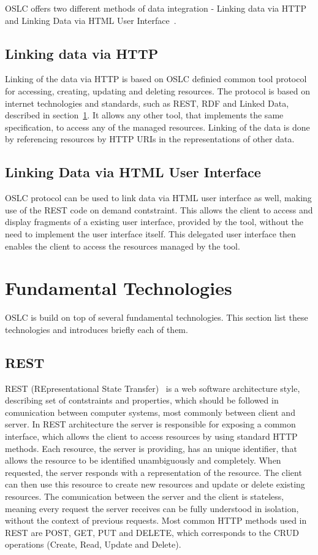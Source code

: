 OSLC offers two different methods of data integration - Linking data via HTTP and Linking Data via HTML User Interface \cite{oslc_primary_integration_techniques}.

\subsection*{Linking data via HTTP}
Linking of the data via HTTP is based on OSLC definied common tool protocol for accessing, creating, updating and deleting resources. The protocol is based on internet technologies and standards, such as REST, RDF and Linked Data, described in section \ref{sec:oslc_fundamental_technologies}. It allows any other tool, that implements the same specification, to access any of the managed resources. Linking of the data is done by referencing resources by HTTP URIs in the representations of other data.

\subsection*{Linking Data via HTML User Interface}
\label {sec:oslc_linking_data_via_html_user_interface}
OSLC protocol can be used to link data via HTML user interface as well, making use of the REST code on demand contstraint. This allows the client to access and display fragments of a existing user interface, provided by the tool, without the need to implement the user interface itself. This delegated user interface then enables the client to access the resources managed by the tool.

\section{Fundamental Technologies}
\label {sec:oslc_fundamental_technologies}
OSLC is build on top of several fundamental technologies. This section list these technologies and introduces briefly each of them.

\subsection*{REST}
REST (REpresentational State Transfer) \cite{rest} is a web software architecture style, describing set of contstraints and properties, which should be followed in comunication between computer systems, most commonly between client and server. In REST architecture the server is responsible for exposing a common interface, which allows the client to access resources by using standard HTTP methods. Each resource, the server is providing, has an unique identifier, that allows the resource to be identified unambiguously and completely. When requested, the server responds with a representation of the resource. The client can then use this resource to create new resources and update or delete existing resources. The comunication between the server and the client is stateless, meaning every request the server receives can be fully understood in isolation, without the context of previous requests. Most common HTTP methods used in REST are POST, GET, PUT and DELETE, which corresponds to the CRUD operations (Create, Read, Update and Delete).

